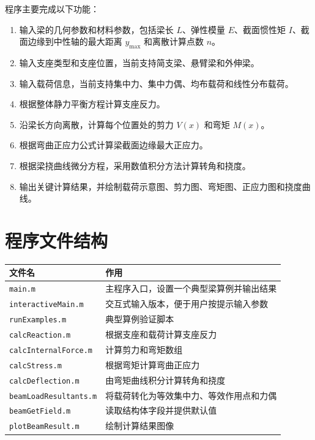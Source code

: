 \documentclass[UTF8,a4paper,12pt]{ctexart}
\numberwithin{equation}{section}
\begin{document}
程序主要完成以下功能：

\begin{enumerate}
    \item 输入梁的几何参数和材料参数，包括梁长 $L$、弹性模量 $E$、截面惯性矩 $I$、截面边缘到中性轴的最大距离 $y_{\max}$ 和离散计算点数 $n$。
    \item 输入支座类型和支座位置，当前支持简支梁、悬臂梁和外伸梁。
    \item 输入载荷信息，当前支持集中力、集中力偶、均布载荷和线性分布载荷。
    \item 根据整体静力平衡方程计算支座反力。
    \item 沿梁长方向离散，计算每个位置处的剪力 $V(x)$ 和弯矩 $M(x)$。
    \item 根据弯曲正应力公式计算梁截面边缘最大正应力。
    \item 根据梁挠曲线微分方程，采用数值积分方法计算转角和挠度。
    \item 输出关键计算结果，并绘制载荷示意图、剪力图、弯矩图、正应力图和挠度曲线。
\end{enumerate}

\section{程序文件结构}

\begin{longtable}{>{\raggedright\arraybackslash}p{5cm}>{\raggedright\arraybackslash}p{9.2cm}}
\toprule
文件名 & 作用 \\
\midrule
\endhead
\verb|main.m| & 主程序入口，设置一个典型梁算例并输出结果 \\
\verb|interactiveMain.m| & 交互式输入版本，便于用户按提示输入参数 \\
\verb|runExamples.m| & 典型算例验证脚本 \\
\verb|calcReaction.m| & 根据支座和载荷计算支座反力 \\
\verb|calcInternalForce.m| & 计算剪力和弯矩数组 \\
\verb|calcStress.m| & 根据弯矩计算弯曲正应力 \\
\verb|calcDeflection.m| & 由弯矩曲线积分计算转角和挠度 \\
\verb|beamLoadResultants.m| & 将载荷转化为等效集中力、等效作用点和力偶 \\
\verb|beamGetField.m| & 读取结构体字段并提供默认值 \\
\verb|plotBeamResult.m| & 绘制计算结果图像 \\
\bottomrule
\end{longtable}
\end{document}
